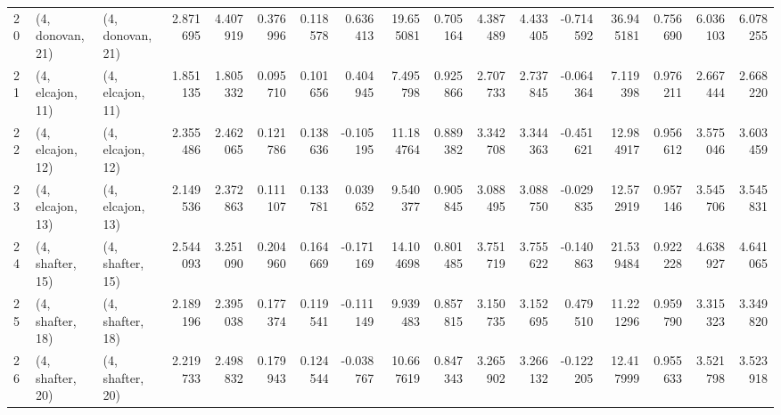 \begin{tabular}{lllrrrrrrrrrrrrrr}
20 &  (4, donovan, 21) &  (4, donovan, 21) &  2.871695 &  4.407919 &   0.376996 &  0.118578 &  0.636413 &  19.655081 &  0.705164 &   4.387489 &  4.433405 & -0.714592 &  36.945181 &  0.756690 &  6.036103 &  6.078255 \\
21 &  (4, elcajon, 11) &  (4, elcajon, 11) &  1.851135 &  1.805332 &   0.095710 &  0.101656 &  0.404945 &   7.495798 &  0.925866 &   2.707733 &  2.737845 & -0.064364 &   7.119398 &  0.976211 &  2.667444 &  2.668220 \\
22 &  (4, elcajon, 12) &  (4, elcajon, 12) &  2.355486 &  2.462065 &   0.121786 &  0.138636 & -0.105195 &  11.184764 &  0.889382 &   3.342708 &  3.344363 & -0.451621 &  12.984917 &  0.956612 &  3.575046 &  3.603459 \\
23 &  (4, elcajon, 13) &  (4, elcajon, 13) &  2.149536 &  2.372863 &   0.111107 &  0.133781 &  0.039652 &   9.540377 &  0.905845 &   3.088495 &  3.088750 & -0.029835 &  12.572919 &  0.957146 &  3.545706 &  3.545831 \\
24 &  (4, shafter, 15) &  (4, shafter, 15) &  2.544093 &  3.251090 &   0.204960 &  0.164669 & -0.171169 &  14.104698 &  0.801485 &   3.751719 &  3.755622 & -0.140863 &  21.539484 &  0.922228 &  4.638927 &  4.641065 \\
25 &  (4, shafter, 18) &  (4, shafter, 18) &  2.189196 &  2.395038 &   0.177374 &  0.119541 & -0.111149 &   9.939483 &  0.857815 &   3.150735 &  3.152695 &  0.479510 &  11.221296 &  0.959790 &  3.315323 &  3.349820 \\
26 &  (4, shafter, 20) &  (4, shafter, 20) &  2.219733 &  2.498832 &   0.179943 &  0.124544 & -0.038767 &  10.667619 &  0.847343 &   3.265902 &  3.266132 & -0.122205 &  12.417999 &  0.955633 &  3.521798 &  3.523918 \\
\bottomrule
\end{tabular}

